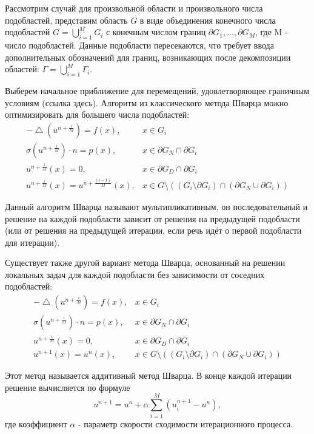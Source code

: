 \documentclass[a4paper, 14pt]{extarticle}
\begin{document}
Рассмотрим случай для произвольной области и произвольного числа подобластей, представим область $G$ в виде объединения конечного числа подобластей $G = \bigcup_{i=1}^{M} G_i$ с конечным числом границ $\partial G_1, \ldots, \partial G_M$, где M - число подобластей. Данные подобласти пересекаются, что требует ввода дополнительных обозначений для границ, возникающих после декомпозиции областей: $\Gamma = \bigcup_{i=1}^{M} \Gamma_i$. 

Выберем начальное приближение для перемещений, удовлетворяющее граничным условиям (ссылка здесь). Алгоритм из классического метода Шварца можно оптимизировать для большего числа подобластей:
\begin{equation*}
\begin{array}{rl}
-\bigtriangleup \! (u^{n+\frac{i}{M}}) = f(x), & x \in G_i \\
\sigma(u^{n+\frac{i}{M}}) \cdot n = p(x), & x \in \partial G_N \cap \partial G_i \\
u^{n+\frac{i}{M}}(x) = 0, & x \in \partial G_D \cap \partial G_i \\ 
u^{n+\frac{i}{M}}(x) = u^{n+\frac{(i - 1)}{M}}(x), & x \in G \setminus ((G_i \setminus \partial G_i) \cap (\partial G_N \cup \partial G_i))
\end{array}
\end{equation*}

Данный алгоритм Шварца называют мультипликативным, он последовательный и решение на каждой подобласти зависит от решения на предыдущей подобласти (или от решения на предыдущей итерации, если речь идёт о первой подобласти для итерации).

Существует также другой вариант метода Шварца, основанный на решении локальных задач для каждой подобласти без зависимости от соседних подобластей:
\begin{equation*}
\begin{array}{rl}
-\bigtriangleup \! (u^{n+\frac{i}{M}}) = f(x), & x \in G_i \\
\sigma(u^{n+\frac{i}{M}}) \cdot n = p(x), & x \in \partial G_N \cap \partial G_i \\
u^{n+\frac{i}{M}}(x) = 0, & x \in \partial G_D \cap \partial G_i \\ 
u^{n+1}(x) = u^{n}(x), & x \in G \setminus ((G_i \setminus \partial G_i) \cap (\partial G_N \cup \partial G_i))
\end{array}
\end{equation*}

Этот метод называется аддитивный метод Шварца. В конце каждой итерации решение вычисляется по формуле 
\begin{equation*}
u^{n+1} = u^{n} + \alpha \sum_{i=1}^{M} (u_i^{n+1} - u^{n}),
\end{equation*}
где коэффициент $\alpha$ - параметр скорости сходимости итерационного процесса. 
\end{document}
